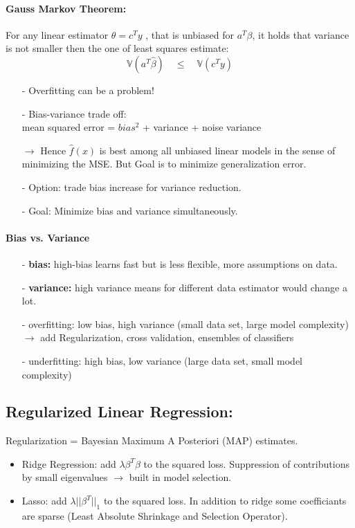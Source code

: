 \paragraph{Gauss Markov Theorem: }
For any linear estimator $\theta = c^Ty$ , that is unbiased for $a^T\beta$, it holds that variance is not smaller then the one of least squares estimate:
\begin{equation}
    \mathbb{V}(a^T\hat{\beta})\quad \leq \quad \mathbb{V}(c^Ty)
\end{equation}{}
\begin{itemize}
    \item[-]Overfitting can be a problem!
    \item[-]Bias-variance trade off:\\
    mean squared error = $bias^2$ + variance + noise variance
    \item[$\rightarrow$] Hence $\hat{f}(x)$ is best among all unbiased linear models in the sense of minimizing the MSE. But Goal is to minimize generalization error.
    \item[-]Option: trade bias increase for variance reduction.
    \item[-]Goal: Minimize bias and variance simultaneously.
\end{itemize}{}

\paragraph{Bias vs. Variance}
\begin{itemize}
    \item[-]\textbf{bias: } high-bias learns fast but is less flexible, more assumptions on data.
    \item[-]\textbf{variance: }high variance means for different data estimator would change a lot.
    \item[-]overfitting: low bias, high variance (small data set, large model complexity)\\
    $\rightarrow$ add Regularization, cross validation, ensembles of classifiers
    \item[-]underfitting: high bias, low variance (large data set, small model complexity)
\end{itemize}{}

\subsection{Regularized Linear Regression:} 
Regularization = Bayesian Maximum A Posteriori (MAP) estimates.
\begin{itemize}
    \item Ridge Regression: add $\lambda \beta^T \beta$ to the squared loss. Suppression of contributions by small eigenvalues $\rightarrow$ built in model selection.
    \item Lasso: add $\lambda ||\beta^T||_1$ to the squared loss. In addition to ridge some coefficiants are sparse (Least Absolute Shrinkage and Selection Operator).
\end{itemize}{}

